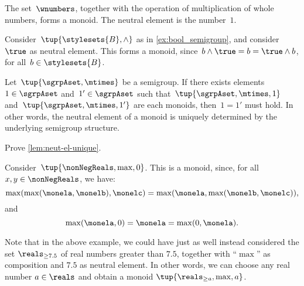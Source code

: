 \begin{example}
    The set~$\wnumbers$, together with the operation of multiplication of whole numbers, forms a monoid.
    The neutral element is the number~$1$.
\end{example}

\begin{example}
    \label{ex:bool_monoid}
    Consider~$\tup{\stylesets{B},\wedge}$ as in \cref{ex:bool_semigroup}, and consider~$\true$ as neutral element.
    This forms a monoid, since~$b\wedge \true=b=\true \wedge b$, for all~$b\in \stylesets{B}$.
\end{example}

\begin{lemma}
    \label{lem:neut-el-unique}
    Let~$\tup{\sgrpAset, \mtimes}$ be a semigroup.
    If there exists elements~$1 \in \sgrpAset$ and~$1' \in \sgrpAset$ such that~$\tup{\sgrpAset, \mtimes, 1}$ and~$\tup{\sgrpAset, \mtimes, 1'}$ are each monoids, then~$1 = 1'$ must hold.
    In other words, the neutral element of a monoid is uniquely determined by the underlying semigroup structure.
\end{lemma}

\begin{gradedexercise}
    \label{ex:UniqueNeutralMonoid}
    Prove \cref{lem:neut-el-unique}.
\end{gradedexercise}


\begin{example}
    Consider~$\tup{\nonNegReals,\max,0}$.
    This is a monoid, since, for all~$x,y\in \nonNegReals$, we have:
    \begin{equation*}
        \max(\max(\monela,\monelb),\monelc)=\max(\monela,\max(\monelb,\monelc)),
    \end{equation*}
    and
    \begin{equation*}
        \max(\monela,0)=\monela=\max(0,\monela).
    \end{equation*}
\end{example}

\begin{remark}
    Note that in the above example, we could have just as well instead considered the set $\reals_{\geq 7.5}$ of real numbers greater than $7.5$, together with ``$\max$'' as composition and $7.5$ as neutral element.
    In other words, we can choose any real number $a \in \reals$ and obtain a monoid $\tup{\reals_{\geq a},\max, a}$.
\end{remark}

